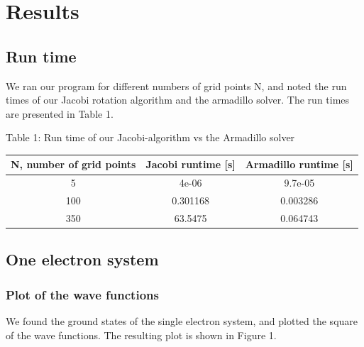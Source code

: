 \documentclass[norsk,a4paper,12pt]{article}
\begin{document}
\section{Results}

\subsection{Run time}
\par
\vspace{3mm}
We ran our program for different numbers of grid points N, and noted the run times of our Jacobi rotation algorithm and the armadillo solver. The run times are presented in Table 1. 
\par
\vspace{3mm}


Table 1: Run time of our Jacobi-algorithm vs the Armadillo solver\par
\vspace{3mm}

\begin{tabular}{|c|c|c|}\hline
     {\bf N, number of grid points} & {\bf Jacobi runtime [s]} & {\bf Armadillo runtime [s]}\\ \hline
     5 & 4e-06 & 9.7e-05\\
     100 & 0.301168 & 0.003286 \\
     350 & 63.5475& 0.064743  \\ \hline

\end{tabular}\par

\subsection{One electron system}\par
\vspace{3mm}

\subsubsection{Plot of the wave functions}
\vspace{3mm}
We found the ground states of the single electron system, and plotted the square of the wave functions. The resulting plot is shown in Figure 1.
\par
\vspace{3mm}
\end{document}
